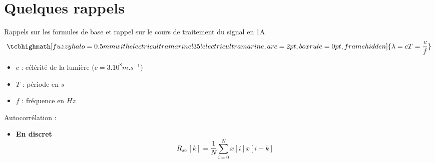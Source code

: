 \chapter*{Quelques rappels}
Rappels sur les formules de base et rappel sur le cours de traitement du signal en 1A
\begin{equation}
    \normalsize
    \tcbhighmath[fuzzy halo=0.5mm with electricultramarine!35!electricultramarine,arc=2pt,
    boxrule=0pt,frame hidden]{ 
        \lambda = cT = \frac{c}{f}
     } \nonumber
    \normalsize
\end{equation}
\begin{itemize}
    \item $c$ : célérité de la lumière ($c = 3.10^{8} m.s^{-1}$)
    \item $T$ : période en $s$
    \item $f$ : fréquence en $Hz$
\end{itemize}
Autocorrélation : \newline
\begin{itemize}
    \item \textbf{En discret} 
    \begin{equation}
        R_{xx}[k] = \frac{1}{N}\sum_{i=0}^{N}{x[i]x[i-k]}
    \end{equation}
\end{itemize}